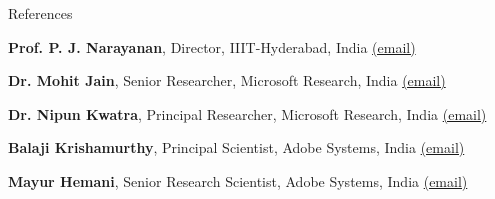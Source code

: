 \documentclass{resume} %
\begin{document}
\begin{rSection}{References} \itemsep -5pt
\item \textbf{Prof. P. J. Narayanan}, Director, IIIT-Hyderabad, India \href{mailto:pjn@iiit.ac.in}{(email)}
\item \textbf{Dr. Mohit Jain}, Senior Researcher, Microsoft Research, India \href{mailto:mohja@microsoft.com}{(email)}
\item \textbf{Dr. Nipun Kwatra}, Principal Researcher, Microsoft Research, India \href{mailto:nkwatra@microsoft.com}{(email)}
\item \textbf{Balaji Krishamurthy}, Principal Scientist, Adobe Systems, India \href{mailto:kbalaji@adobe.com}{(email)}
\item \textbf{Mayur Hemani}, Senior Research Scientist, Adobe Systems, India \href{mailto:mayur@adobe.com}{(email)}
\end{rSection}
\end{document}
